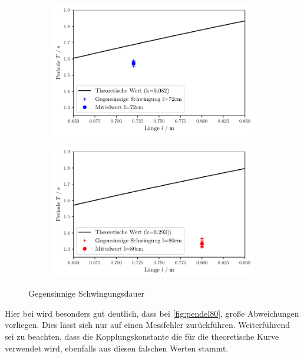 \begin{figure}
    \begin{subfigure}[c]{0.5\textwidth}
        \includegraphics[width=\textwidth]{plots/plot2.pdf}
    \end{subfigure}
    \begin{subfigure}[c]{0.5\textwidth}
        \includegraphics[width=\textwidth]{plots/plot3.pdf}
        \label{fig:pedel80}
    \end{subfigure}
    \caption{Gegensinnige Schwingungsdauer}
\end{figure}

Hier bei wird besonders gut deutlich, dass bei \ref{fig:pendel80}, große Abweichungen
vorliegen. Dies lässt sich nur auf einen Messfehler zurückführen.
Weiterführend sei zu beachten, dass die Kopplungskonstante die für die theoretische Kurve
verwendet wird, ebenfalls aus diesen falschen Werten stammt.

